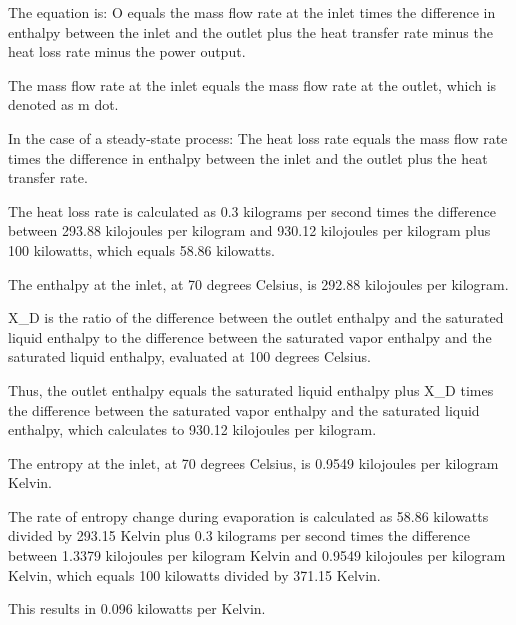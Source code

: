 The equation is:
O equals the mass flow rate at the inlet times the difference in enthalpy between the inlet and the outlet plus the heat transfer rate minus the heat loss rate minus the power output.

The mass flow rate at the inlet equals the mass flow rate at the outlet, which is denoted as m dot.

In the case of a steady-state process:
The heat loss rate equals the mass flow rate times the difference in enthalpy between the inlet and the outlet plus the heat transfer rate.

The heat loss rate is calculated as 0.3 kilograms per second times the difference between 293.88 kilojoules per kilogram and 930.12 kilojoules per kilogram plus 100 kilowatts, which equals 58.86 kilowatts.

The enthalpy at the inlet, at 70 degrees Celsius, is 292.88 kilojoules per kilogram.

X_D is the ratio of the difference between the outlet enthalpy and the saturated liquid enthalpy to the difference between the saturated vapor enthalpy and the saturated liquid enthalpy, evaluated at 100 degrees Celsius.

Thus, the outlet enthalpy equals the saturated liquid enthalpy plus X_D times the difference between the saturated vapor enthalpy and the saturated liquid enthalpy, which calculates to 930.12 kilojoules per kilogram.

The entropy at the inlet, at 70 degrees Celsius, is 0.9549 kilojoules per kilogram Kelvin.

The rate of entropy change during evaporation is calculated as 58.86 kilowatts divided by 293.15 Kelvin plus 0.3 kilograms per second times the difference between 1.3379 kilojoules per kilogram Kelvin and 0.9549 kilojoules per kilogram Kelvin, which equals 100 kilowatts divided by 371.15 Kelvin.

This results in 0.096 kilowatts per Kelvin.